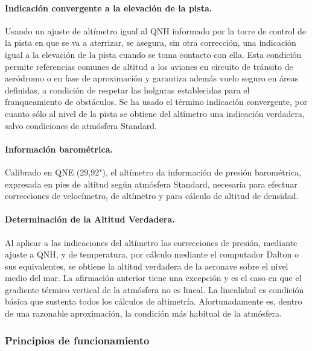 \documentclass{article}
\begin{document}
\paragraph{Indicación convergente a la elevación de la pista.}
Usando un ajuste de altímetro igual al QNH informado por la torre de control de la pista en que se va a aterrizar, se asegura, sin otra corrección, una indicación igual a la elevación de la pista cuando se toma contacto con ella.
Esta condición permite referencias comunes de altitud a los aviones en circuito de tránsito de aeródromo o en fase de aproximación y garantiza además vuelo seguro en áreas definidas, a condición de respetar las holguras establecidas para el franqueamiento de obstáculos.
Se ha usado el término indicación convergente, por cuanto sólo al nivel de la pista se obtiene del altímetro una indicación verdadera, salvo condiciones de atmósfera Standard.
\paragraph{Información barométrica.}
Calibrado en QNE (29,92"), el altímetro da información de presión barométrica, expresada en pies de altitud según atmósfera Standard, necesaria para efectuar correcciones de velocímetro, de altímetro y para cálculo de altitud de densidad.
\paragraph{Determinación de la Altitud Verdadera.}
Al aplicar a las indicaciones del altímetro las correcciones de presión, mediante ajuste a QNH, y de temperatura, por cálculo mediante el computador Dalton o sus equivalentes, se obtiene la altitud verdadera de la aeronave sobre el nivel medio del mar.
La afirmación anterior tiene una excepción y es el caso en que el gradiente térmico vertical de la atmósfera no es lineal. La linealidad es condición básica que sustenta todos los cálculos de altimetría. Afortunadamente es, dentro de una razonable aproximación, la condición más habitual de la atmósfera.


\subsubsection*{Principios de funcionamiento}
\end{document}
